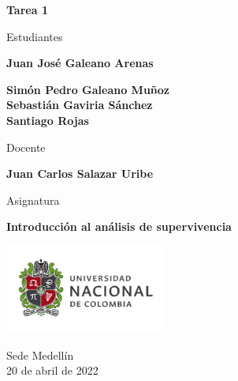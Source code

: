 \begin{titlepage}
   \Large{
   \begin{center}
       \vspace*{1cm}

       \textbf{Tarea 1}

            
       \vspace{1.1cm}
       
       Estudiantes
       
       \vspace{0.5cm}
        
	\textbf{Juan José Galeano Arenas}        

       \textbf{Simón Pedro Galeano Muñoz} \\

	\textbf{Sebastián Gaviria Sánchez} \\

	\textbf{Santiago Rojas}

              \vspace{1cm}
       
       Docente
       
       \vspace{0.5cm}

       \textbf{Juan Carlos Salazar Uribe}
       
       \vspace{0.4cm}

       \vspace{1.4cm}
       
       Asignatura
       
       \vspace{0.5cm}

       \textbf{Introducción al análisis de supervivencia}

       \vfill

            
       \vspace{0.4cm}
     
       \includegraphics[width=0.4\textwidth]{logounal.png}
            
       Sede Medellín\\
       20 de abril de 2022
       
   \end{center}
   }
\end{titlepage}